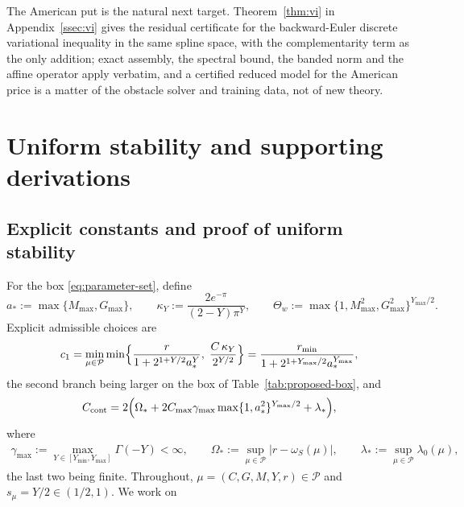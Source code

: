 \documentclass[11pt]{amsart}
\theoremstyle{remark}
\newcommand{\Pset}{\mathcal{P}}
\newcommand{\rf}{r}
\begin{document}
The American put is the natural next target.  Theorem~\ref{thm:vi} in Appendix~\ref{ssec:vi} gives
the residual certificate for the backward-Euler discrete variational inequality in the same spline
space, with the complementarity term as the only addition; exact assembly, the spectral bound, the
banded norm and the affine operator apply verbatim, and a certified reduced model for the
American price is a matter of the obstacle solver and training data, not of new theory.
\FloatBarrier

\appendix
\section{Uniform stability and supporting derivations}
\label{app:proofs}
\subsection{Explicit constants and proof of uniform stability}
\label{app:proof-uniform}\label{ssec:lk-coercivity}
For the box \eqref{eq:parameter-set}, define
\begin{equation}
  a_\ast:=\max\{M_{\max},G_{\max}\},\qquad
  \kappa_Y:=\frac{2e^{-\pi}}{(2-Y)\pi^{Y}},\qquad
  \Theta_w:=\max\{1,M_{\max}^2,G_{\max}^2\}^{Y_{\max}/2}.
  \label{eq:uniform-constants-aux}
\end{equation}
Explicit admissible choices are
\begin{equation}
  c_1
  =\min_{\mu\in\Pset}\min\Bigl\{
    \frac{\rf}{1+2^{1+Y/2}a_\ast^{Y}},\;
    \frac{C\,\kappa_Y}{2^{Y/2}}
  \Bigr\}
  =\frac{r_{\min}}{1+2^{1+Y_{\max}/2}a_\ast^{Y_{\max}}},
  \label{eq:c1-explicit}
\end{equation}
the second branch being larger on the box of Table~\ref{tab:proposed-box}, and
\begin{equation}
  C_{\rm cont}
  =2\Bigl(
    \Omega_\ast
    +2C_{\max}\gamma_{\max}\max\{1,a_\ast^2\}^{Y_{\max}/2}
    +\lambda_\ast
  \Bigr),
  \label{eq:Ccont-explicit}
\end{equation}
where
\begin{equation}
\begin{gathered}
\gamma_{\max}:=\!\!\max_{Y\in[Y_{\min},Y_{\max}]}\!\!\Gamma(-Y)<\infty,
\qquad
\Omega_\ast:=\sup_{\mu\in\Pset}|\rf-\omega_S(\mu)|,
\qquad
\lambda_\ast:=\sup_{\mu\in\Pset}\lambda_0(\mu),
\end{gathered}
\label{eq:uniform-aux-constants}
\end{equation}
the last two being finite.
Throughout, $\mu=(C,G,M,Y,\rf)\in\Pset$ and $s_\mu=Y/2\in(1/2,1)$.  We work on
\end{document}
